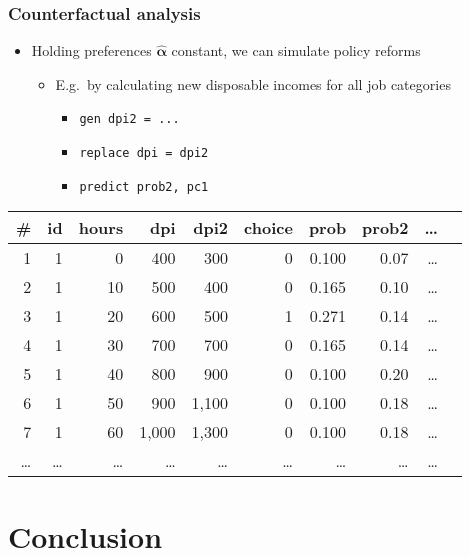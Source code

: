\documentclass[handout,intlimits]{beamer}
\def\blue#1{\textcolor{zewblue}{#1}}
\def\vect#1{\mathbold{#1}}
\begin{document}
\begin{frame}[fragile]
\frametitle{Counterfactual analysis}
\begin{itemize}
	\item \blue{Holding preferences $\vect{\hat{\alpha}}$ constant, we can simulate policy reforms}
	\begin{itemize}
		\item E.g.\ by calculating new disposable incomes for all job categories
		\begin{itemize}
			\item \verb+gen dpi2 = ...+
			\item \verb+replace dpi = dpi2+
			\item \verb+predict prob2, pc1+
		\end{itemize}
	\end{itemize}
\end{itemize}
\begin{table}[htbp]
	\centering\tiny
	\begin{threeparttable}
	\begin{tabular}{rrrrrrrrrr}
	\toprule
	\textbf{\#} & \textbf{id} & \textbf{hours} & \textbf{dpi} & \textbf{dpi2} & \textbf{choice} & \textbf{prob} & \textbf{prob2} & \textbf{\dots} \\
	\midrule
	1	&	1	&	0	&	400	&	300	&	0	& 0.100	&	0.07	& \dots \\
	2	&	1	&	10	&	500	&	400	&	0	& 0.165	&	0.10	& \dots \\
	3	&	1	&	20	&	600	&	500	&	1	& 0.271	&	0.14	& \dots \\
	4	&	1	&	30	&	700	&	700	&	0	& 0.165	&	0.14	& \dots \\
	5	&	1	&	40	&	800	&	900	&	0	& 0.100	&	0.20	& \dots \\
	6	&	1	&	50	&	900	& 1,100	&	0	& 0.100	&	0.18	& \dots \\
	7	&	1	&	60	& 1,000	& 1,300	&	0	& 0.100	&	0.18	& \dots \\
	\midrule
	\dots	&	\dots	&	\dots	&	\dots	& \dots	& \dots	&	\dots	&	\dots& \dots \\
	\bottomrule
	\end{tabular}
	\end{threeparttable}
\end{table}
\end{frame}


\section{Conclusion}
\end{document}
